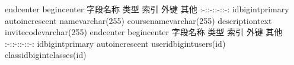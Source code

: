 {}\markdownRendererBackslash{}end\markdownRendererLeftBrace{}center\markdownRendererRightBrace{}\markdownRendererInterblockSeparator
{}\markdownRendererInterblockSeparator
{}\markdownRendererBackslash{}begin\markdownRendererLeftBrace{}center\markdownRendererRightBrace{}\markdownRendererInterblockSeparator
{}\markdownRendererPipe{} 字段名称 \markdownRendererPipe{} 类型 \markdownRendererPipe{} 索引 \markdownRendererPipe{} 外键 \markdownRendererPipe{} 其他 \markdownRendererPipe{} \markdownRendererPipe{}:-:\markdownRendererPipe{}:-:\markdownRendererPipe{}:-:\markdownRendererPipe{}:-:\markdownRendererPipe{} \markdownRendererPipe{}id\markdownRendererPipe{}bigint\markdownRendererPipe{}primary\markdownRendererPipe{}\markdownRendererPipe{} auto\markdownRendererBackslash{}\markdownRendererUnderscore{}increscent\markdownRendererPipe{} \markdownRendererPipe{}name\markdownRendererPipe{}varchar(255)\markdownRendererPipe{}\markdownRendererPipe{}\markdownRendererPipe{}\markdownRendererPipe{} \markdownRendererPipe{}course\markdownRendererBackslash{}\markdownRendererUnderscore{}name\markdownRendererPipe{}varchar(255)\markdownRendererPipe{}\markdownRendererPipe{}\markdownRendererPipe{}\markdownRendererPipe{} \markdownRendererPipe{}description\markdownRendererPipe{}text\markdownRendererPipe{}\markdownRendererPipe{}\markdownRendererPipe{}\markdownRendererPipe{} \markdownRendererPipe{}invite\markdownRendererBackslash{}\markdownRendererUnderscore{}code\markdownRendererPipe{}varchar(255)\markdownRendererPipe{}\markdownRendererPipe{}\markdownRendererPipe{}\markdownRendererPipe{}\markdownRendererInterblockSeparator
{}\markdownRendererBackslash{}end\markdownRendererLeftBrace{}center\markdownRendererRightBrace{}\markdownRendererInterblockSeparator
{}\markdownRendererInterblockSeparator
{}\markdownRendererBackslash{}begin\markdownRendererLeftBrace{}center\markdownRendererRightBrace{}\markdownRendererInterblockSeparator
{}\markdownRendererPipe{} 字段名称 \markdownRendererPipe{} 类型 \markdownRendererPipe{} 索引 \markdownRendererPipe{} 外键 \markdownRendererPipe{} 其他 \markdownRendererPipe{} \markdownRendererPipe{}:-:\markdownRendererPipe{}:-:\markdownRendererPipe{}:-:\markdownRendererPipe{}:-:\markdownRendererPipe{} \markdownRendererPipe{}id\markdownRendererPipe{}bigint\markdownRendererPipe{}primary\markdownRendererPipe{}\markdownRendererPipe{} auto\markdownRendererBackslash{}\markdownRendererUnderscore{}increscent\markdownRendererPipe{} \markdownRendererPipe{}user\markdownRendererBackslash{}\markdownRendererUnderscore{}id\markdownRendererPipe{}bigint\markdownRendererPipe{}\markdownRendererPipe{}users(id)\markdownRendererPipe{}\markdownRendererPipe{} \markdownRendererPipe{}class\markdownRendererBackslash{}\markdownRendererUnderscore{}id\markdownRendererPipe{}bigint\markdownRendererPipe{}\markdownRendererPipe{}classes(id)\markdownRendererPipe{}\markdownRendererPipe{}\markdownRendererInterblockSeparator
